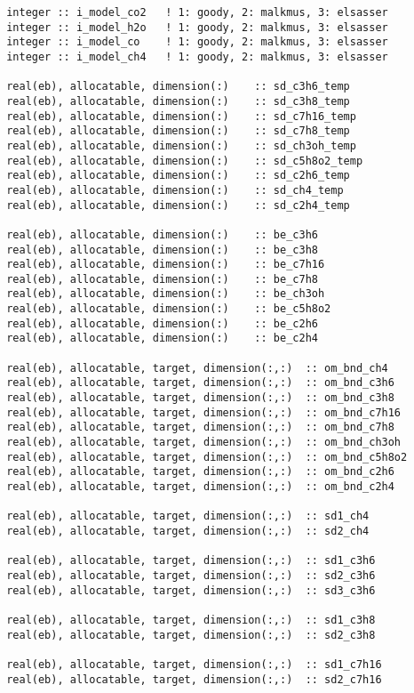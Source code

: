 \begin{lstlisting}
 integer :: i_model_co2   ! 1: goody, 2: malkmus, 3: elsasser
 integer :: i_model_h2o   ! 1: goody, 2: malkmus, 3: elsasser
 integer :: i_model_co    ! 1: goody, 2: malkmus, 3: elsasser
 integer :: i_model_ch4   ! 1: goody, 2: malkmus, 3: elsasser

 real(eb), allocatable, dimension(:)    :: sd_c3h6_temp
 real(eb), allocatable, dimension(:)    :: sd_c3h8_temp
 real(eb), allocatable, dimension(:)    :: sd_c7h16_temp
 real(eb), allocatable, dimension(:)    :: sd_c7h8_temp
 real(eb), allocatable, dimension(:)    :: sd_ch3oh_temp
 real(eb), allocatable, dimension(:)    :: sd_c5h8o2_temp
 real(eb), allocatable, dimension(:)    :: sd_c2h6_temp
 real(eb), allocatable, dimension(:)    :: sd_ch4_temp
 real(eb), allocatable, dimension(:)    :: sd_c2h4_temp

 real(eb), allocatable, dimension(:)    :: be_c3h6
 real(eb), allocatable, dimension(:)    :: be_c3h8
 real(eb), allocatable, dimension(:)    :: be_c7h16
 real(eb), allocatable, dimension(:)    :: be_c7h8
 real(eb), allocatable, dimension(:)    :: be_ch3oh
 real(eb), allocatable, dimension(:)    :: be_c5h8o2
 real(eb), allocatable, dimension(:)    :: be_c2h6
 real(eb), allocatable, dimension(:)    :: be_c2h4

 real(eb), allocatable, target, dimension(:,:)  :: om_bnd_ch4
 real(eb), allocatable, target, dimension(:,:)  :: om_bnd_c3h6
 real(eb), allocatable, target, dimension(:,:)  :: om_bnd_c3h8
 real(eb), allocatable, target, dimension(:,:)  :: om_bnd_c7h16
 real(eb), allocatable, target, dimension(:,:)  :: om_bnd_c7h8
 real(eb), allocatable, target, dimension(:,:)  :: om_bnd_ch3oh
 real(eb), allocatable, target, dimension(:,:)  :: om_bnd_c5h8o2
 real(eb), allocatable, target, dimension(:,:)  :: om_bnd_c2h6
 real(eb), allocatable, target, dimension(:,:)  :: om_bnd_c2h4

 real(eb), allocatable, target, dimension(:,:)  :: sd1_ch4
 real(eb), allocatable, target, dimension(:,:)  :: sd2_ch4

 real(eb), allocatable, target, dimension(:,:)  :: sd1_c3h6
 real(eb), allocatable, target, dimension(:,:)  :: sd2_c3h6
 real(eb), allocatable, target, dimension(:,:)  :: sd3_c3h6

 real(eb), allocatable, target, dimension(:,:)  :: sd1_c3h8
 real(eb), allocatable, target, dimension(:,:)  :: sd2_c3h8

 real(eb), allocatable, target, dimension(:,:)  :: sd1_c7h16
 real(eb), allocatable, target, dimension(:,:)  :: sd2_c7h16


\end{lstlisting}
